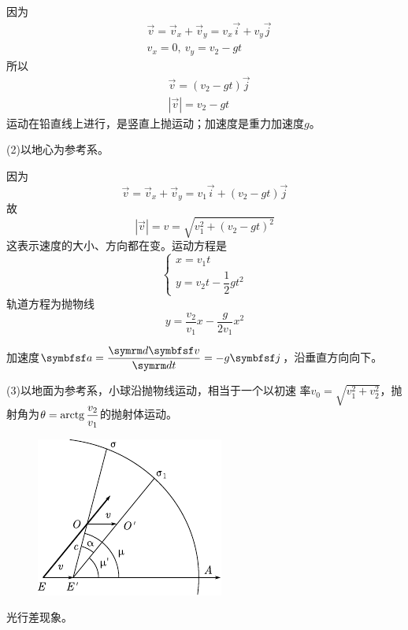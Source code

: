 因为\vspace{-1em}
\begin{align*}
    &\vec{v}=\vec{v}_x+\vec{v}_y=v_x\vec{i}+v_y\vec{j} \\
    &v_x=0,~ v_y=v_2-gt
\end{align*}
所以\vspace{-1em}
\begin{align*}
    &\vec{v}=(v_2-gt)\vec{j} \\
    &|\vec{v}|=v_2-gt
\end{align*}
运动在铅直线上进行，是竖直上抛运动；加速度是重力加速度$g$。

(2)以地心为参考系。

因为\vspace{-1em}
\begin{equation*}
    \vec{v}=\vec{v}_x+\vec{v}_y=v_1\vec{i}+(v_2-gt)\vec{j}
\end{equation*}
故\vspace{-1em}
\begin{equation*}
        |\vec{v}|=v=\sqrt{v_1^2+(v_2-gt)^2}
\end{equation*}
这表示速度的大小、方向都在变。运动方程是
\begin{equation*}
    \left\{\begin{array}{l}
        x=v_1t \\
        y=v_2t-\dfrac{1}{2}gt^2
    \end{array}\right.
\end{equation*}
轨道方程为抛物线
\begin{equation*}
    y=\frac{v_2}{v_1}x-\frac{g}{2v_1}x^2
\end{equation*}

\noindent 加速度$\vec{a}=\dfrac{\dif \vec{v}}{\dif t}=-g\vec{j}$，沿垂直方向向下。

(3)以地面为参考系，小球沿抛物线运动，相当于一个以初速
率$\displaystyle v_0=\sqrt{v_1^2+v_2^2}$，抛射角为$\theta=\operatorname{arctg}\dfrac{v_2}{v_1}$的抛射体运动。

\begin{figure}
    \vspace{1em}
    \centering
    \includegraphics{figure/fig02.09}
    \caption{}
    \label{fig:02.09}
\end{figure}
\example 光行差现象。

